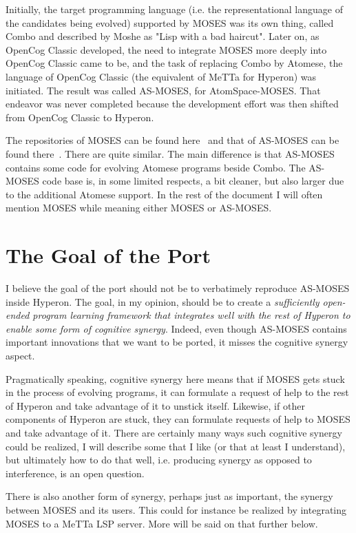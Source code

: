 \documentclass[]{report}
\begin{document}
Initially, the target programming language (i.e. the representational
language of the candidates being evolved) supported by MOSES was its
own thing, called Combo and described by Moshe as "Lisp with a bad
haircut".  Later on, as OpenCog Classic developed, the need to
integrate MOSES more deeply into OpenCog Classic came to be, and the
task of replacing Combo by Atomese, the language of OpenCog Classic
(the equivalent of MeTTa for Hyperon) was initiated.  The result was
called AS-MOSES, for AtomSpace-MOSES.  That endeavor was never
completed because the development effort was then shifted from OpenCog
Classic to Hyperon.

The repositories of MOSES can be found here~\cite{MOSES} and that of
AS-MOSES can be found there~\cite{ASMOSES}.  There are quite similar.
The main difference is that AS-MOSES contains some code for evolving
Atomese programs beside Combo.  The AS-MOSES code base is, in some
limited respects, a bit cleaner, but also larger due to the additional
Atomese support.  In the rest of the document I will often mention
MOSES while meaning either MOSES or AS-MOSES.

\section{The Goal of the Port}

I believe the goal of the port should not be to verbatimely reproduce
AS-MOSES inside Hyperon.  The goal, in my opinion, should be to create
a \emph{sufficiently open-ended program learning framework that
integrates well with the rest of Hyperon to enable some form of
cognitive synergy}.  Indeed, even though AS-MOSES contains important
innovations that we want to be ported, it misses the cognitive synergy
aspect.

Pragmatically speaking, cognitive synergy here means that if MOSES
gets stuck in the process of evolving programs, it can formulate a
request of help to the rest of Hyperon and take advantage of it to
unstick itself.  Likewise, if other components of Hyperon are stuck,
they can formulate requests of help to MOSES and take advantage of it.
There are certainly many ways such cognitive synergy could be
realized, I will describe some that I like (or that at least I
understand), but ultimately how to do that well, i.e. producing
synergy as opposed to interference, is an open question.

There is also another form of synergy, perhaps just as important, the
synergy between MOSES and its users.  This could for instance be
realized by integrating MOSES to a MeTTa LSP server.  More will be
said on that further below.
\end{document}
